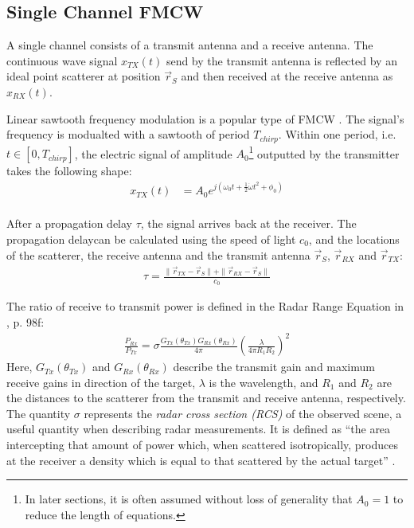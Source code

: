 \subsection{Single Channel FMCW}
\label{sec:single_channel_fmcw}
A single channel consists of a transmit antenna and a receive antenna.
The continuous wave signal $x_{TX}(t)$ send by the transmit antenna
is reflected by an ideal point scatterer at position $\vec r_S$
and then received at the receive antenna as $x_{RX}(t)$.

Linear sawtooth frequency modulation is a popular type of FMCW \cite{jankiraman}.
The signal's frequency is modualted with a sawtooth of period $T_{chirp}$.
Within one period, i.e.\ $t \in [0, T_{chirp}]$,
the electric signal of amplitude $A_0$\footnote{
    In later sections, it is often assumed without loss of generality that $A_0=1$ to reduce the length of equations.
} outputted by the transmitter takes the following shape:
\begin{align}
    x_{TX}(t) & = A_0 e^{j(\omega_0t + \frac{1}{2}\dot \omega t^2 + \phi_0)} \label{eq:x_TX} \\
\end{align}

After a propagation delay $\tau$, the signal arrives back at the receiver.
The propagation delaycan be calculated using the speed of light $c_0$,
and the locations of the scatterer, the receive antenna and the transmit antenna $\vec r_S$,  $\vec r_{RX}$ and $\vec r_{TX}$:
\begin{align}
    \tau = \frac{\| \vec r_{TX} - \vec r_S \|+\| \vec r_{RX} - \vec r_S \|}{c_0}
\end{align}

The ratio of receive to transmit power is defined in the Radar Range Equation in \cite{balanis},  p. 98f:
\begin{align}
    \frac{P_{Rx}}{P_{Tx}} = \sigma \frac{G_{Tx}(\theta_{Tx}) G_{Rx}(\theta_{Rx})}{4\pi} \left(\frac{\lambda}{4\pi R_1 R_2}\right)^2
    \label{eq:channel_gain}
\end{align}
Here, $G_{Tx}(\theta_{Tx})$ and $G_{Rx}(\theta_{Rx})$ describe the transmit gain and maximum receive gains
in direction of the target, $\lambda$ is the wavelength, and $R_1$ and $R_2$ are the distances to the scatterer
from the transmit and receive antenna, respectively.
The quantity $\sigma$ represents the \emph{radar cross section (RCS)} of the observed scene,
a useful quantity when describing radar measurements.
It is defined as ``the area intercepting that amount of power which,
when scattered isotropically, produces at the receiver a density
which is equal to that scattered by the actual target'' \cite{balanis_engineering_1989}.

